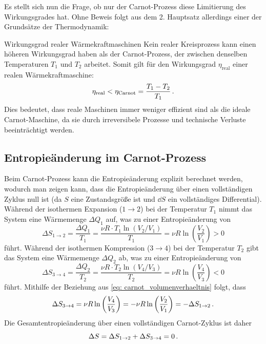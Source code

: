Es stellt sich nun die Frage, ob nur der Carnot-Prozess diese Limitierung des Wirkungsgrades hat. Ohne Beweis folgt aus dem 2. Hauptsatz allerdings einer der Grundsätze der Thermodynamik:
\begin{importantbox}{Wirkungsgrad realer Wärmekraftmaschinen}
    Kein realer Kreisprozess kann einen höheren Wirkungsgrad haben als der Carnot-Prozess, der zwischen denselben Temperaturen $T_1$ und $T_2$ arbeitet. Somit gilt für den Wirkungsgrad $\eta_{\text{real}}$ einer realen Wärmekraftmaschine:
    \begin{equation}
        \eta_{\text{real}} < \eta_{\text{Carnot}} = \frac{T_1 - T_2}{T_1} \,.
    \end{equation}
    Dies bedeutet, dass reale Maschinen immer weniger effizient sind als die ideale Carnot-Maschine, da sie durch irreversibele Prozesse und technische Verluste beeinträchtigt werden.
\end{importantbox} 


\subsection{Entropieänderung im Carnot-Prozess}
Beim Carnot-Prozess kann die Entropieänderung explizit berechnet werden, wodurch man zeigen kann, dass die Entropieänderung über einen vollständigen Zyklus null ist (da $S$ eine Zustandsgröße ist und $\dd S$ ein vollständiges Differential). Während der isothermen Expansion ($1 \to 2$) bei der Temperatur $T_1$ nimmt das System eine Wärmemenge $\Delta Q_1$ auf, was zu einer Entropieänderung von
\begin{equation}
    \Delta S_{1\to 2} = \frac{\Delta Q_1}{T_1} = \frac{\nu R \cdot T_1 \ln(V_2/V_1)}{T_1} = \nu R \ln\left(\frac{V_2}{V_1}\right) > 0
\end{equation}
führt. Während der isothermen Kompression ($3 \to 4$) bei der Temperatur $T_2$ gibt das System eine Wärmemenge $\Delta Q_2$ ab, was zu einer Entropieänderung von
\begin{equation}
    \Delta S_{3\to 4} = \frac{\Delta Q_2}{T_2} = \frac{\nu R \cdot T_2 \ln(V_4/V_3)}{T_2} = \nu R \ln\left(\frac{V_4}{V_3}\right) < 0
\end{equation}
führt. Mithilfe der Beziehung aus \cref{eq: carnot_volumenverhaeltnis} folgt, dass 
\begin{equation}
    \Delta S_{3\to 4} = \nu R \ln\left(\frac{V_4}{V_3}\right) = -\nu R \ln\left(\frac{V_2}{V_1}\right) = -\Delta S_{1\to 2} \,.
\end{equation}
Die Gesamtentropieänderung über einen vollständigen Carnot-Zyklus ist daher
\begin{equation}
    \Delta S = \Delta S_{1 \to 2} + \Delta S_{3 \to 4} = 0 \,.
\end{equation}


